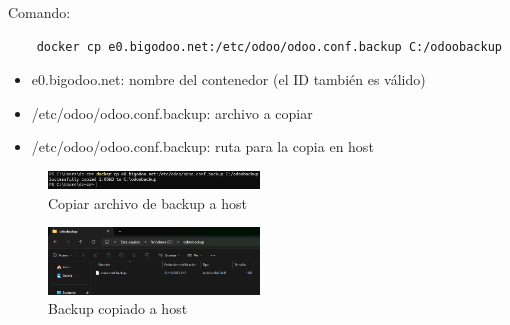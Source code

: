 \documentclass[a4paper,12pt]{article}
\begin{document}
Comando: 
\begin{verbatim}
    docker cp e0.bigodoo.net:/etc/odoo/odoo.conf.backup C:/odoobackup
\end{verbatim}

\begin{itemize}
    \item e0.bigodoo.net: nombre del contenedor (el ID también es válido)
    \item /etc/odoo/odoo.conf.backup: archivo a copiar
    \item /etc/odoo/odoo.conf.backup: ruta para la copia en host
\end{itemize}

\begin{figure}[h!]
    \centering
    \includegraphics[width=0.5\textwidth]{pr2odoo85-copiarBackupAhost.png}
    \caption{Copiar archivo de backup a host}
\end{figure}
\FloatBarrier

\begin{figure}[h!]
    \centering
    \includegraphics[width=0.5\textwidth]{pr2odoo86-backupCopiado.png}
    \caption{Backup copiado a host}
\end{figure}
\FloatBarrier
\end{document}
